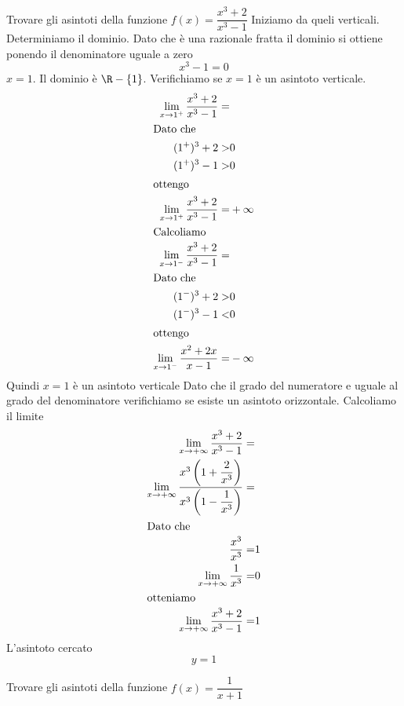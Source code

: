 \begin{exercise}
	Trovare gli asintoti della funzione $f(x)=\dfrac{x^3+2}{x^3-1}$
	\tcblower
	Iniziamo da queli verticali. Determiniamo il dominio. Dato che è una razionale fratta il dominio si ottiene ponendo il denominatore uguale a zero\[x^3-1=0\] $x=1$. Il dominio è $\R-\lbrace1\rbrace$. Verifichiamo se $x=1$ è un asintoto verticale.
	\begin{align*}
	\lim_{x\to 1^+}\dfrac{x^3+2}{x^3-1}=&\\
	\intertext{Dato che}
	(1^+)^3+2>&0\\
	(1^+)^3-1>&0\\
	\intertext{ottengo}
	\lim_{x\to 1^+}\dfrac{x^3+2}{x^3-1}=&+\infty\\
		\intertext{Calcoliamo}
	\lim_{x\to 1^-}\dfrac{x^3+2}{x^3-1}=&\\
		\intertext{Dato che}
	(1^-)^3+2>&0\\
	(1^-)^3-1<&0\\
	\intertext{ottengo}
	\lim_{x\to 1^-}\dfrac{x^2+2x}{x-1}=&-\infty\\
	\end{align*}
	Quindi $x=1$ è un asintoto verticale
	Dato che il grado del numeratore e uguale al grado del denominatore verifichiamo se esiste un asintoto orizzontale. Calcoliamo il limite
	\begin{align*}
	\lim_{x\to +\infty}\dfrac{x^3+2}{x^3-1}=&\\
	\lim_{x\to +\infty}\dfrac{x^3\left(1+\dfrac{2}{x^3}\right)}{x^3\left(1-\dfrac{1}{x^3}\right)}=&\\
	\intertext{Dato che}
	\dfrac{x^3}{x^3}=&1\\
	\lim_{x\to +\infty}\dfrac{1}{x^3}=&0\\
	\intertext{otteniamo}
	\lim_{x\to +\infty}\dfrac{x^3+2}{x^3-1}=&1\\
	\end{align*}
	L'asintoto cercato\[y=1\]
\end{exercise}
\begin{exercise}[no solution]
	Trovare gli asintoti della funzione
	$f(x)=\dfrac{1}{x+1}$
\end{exercise}
